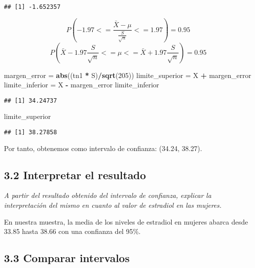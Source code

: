 \documentclass[
]{article}
\newenvironment{Shaded}{\begin{snugshade}}{\end{snugshade}}
\newcommand{\DecValTok}[1]{\textcolor[rgb]{0.00,0.00,0.81}{#1}}
\newcommand{\KeywordTok}[1]{\textcolor[rgb]{0.13,0.29,0.53}{\textbf{#1}}}
\newcommand{\NormalTok}[1]{#1}
\newcommand{\OperatorTok}[1]{\textcolor[rgb]{0.81,0.36,0.00}{\textbf{#1}}}
\newcommand{\StringTok}[1]{\textcolor[rgb]{0.31,0.60,0.02}{#1}}
\begin{document}
\begin{verbatim}
## [1] -1.652357
\end{verbatim}

\[ P(-1.97 <= \frac{\bar{X} - \mu}{\frac{S}{\sqrt{n}}} <= 1.97) = 0.95 \]
\[ P(\bar{X} - 1.97\frac{S}{\sqrt{n}} <= \mu <= \bar{X} + 1.97\frac{S}{\sqrt{n}}) = 0.95 \]

\begin{Shaded}
\begin{Highlighting}[]
\NormalTok{margen_error =}\StringTok{ }\KeywordTok{abs}\NormalTok{((tn1 }\OperatorTok{*}\StringTok{ }\NormalTok{S)}\OperatorTok{/}\KeywordTok{sqrt}\NormalTok{(}\DecValTok{205}\NormalTok{))}
\NormalTok{limite_superior =}\StringTok{ }\NormalTok{X }\OperatorTok{+}\StringTok{ }\NormalTok{margen_error}
\NormalTok{limite_inferior =}\StringTok{ }\NormalTok{X }\OperatorTok{-}\StringTok{ }\NormalTok{margen_error}
\NormalTok{limite_inferior }
\end{Highlighting}
\end{Shaded}

\begin{verbatim}
## [1] 34.24737
\end{verbatim}

\begin{Shaded}
\begin{Highlighting}[]
\NormalTok{limite_superior}
\end{Highlighting}
\end{Shaded}

\begin{verbatim}
## [1] 38.27858
\end{verbatim}

Por tanto, obtenemos como intervalo de confianza: (34.24, 38.27).

\hypertarget{interpretar-el-resultado}{%
\subsection{3.2 Interpretar el
resultado}\label{interpretar-el-resultado}}

\emph{A partir del resultado obtenido del intervalo de confianza,
explicar la interpretación del mismo en cuanto al valor de estradiol en
las mujeres.}

En nuestra muestra, la media de los niveles de estradiol en mujeres
abarca desde 33.85 hasta 38.66 con una confianza del 95\%.

\hypertarget{comparar-intervalos}{%
\subsection{3.3 Comparar intervalos}\label{comparar-intervalos}}
\end{document}
